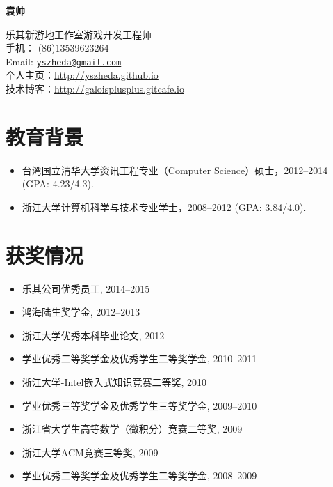 \documentclass[letterpaper]{article}
\def\name{袁帅}
\begin{document}
\centerline{\huge\bf \name} \vspace{0.25in}
\begin{minipage}[t]{0.8\textwidth}
    乐其新游地工作室游戏开发工程师 \\
    手机： (86)13539623264   \\
    Email: \href{mailto:yszheda@gmail.com}{\tt yszheda@gmail.com}\\
    个人主页：\url{http://yszheda.github.io} \\
    技术博客：\url{http://galoisplusplus.gitcafe.io}
\end{minipage}

\section*{教育背景}
\begin{itemize}
    \item 台湾国立清华大学资讯工程专业（Computer Science）硕士，2012--2014 (GPA: 4.23/4.3).
    \item 浙江大学计算机科学与技术专业学士，2008--2012 (GPA: 3.84/4.0).
\end{itemize}

\section*{获奖情况}
\begin{itemize}
    \item 乐其公司优秀员工, 2014--2015
    \item 鸿海陆生奖学金, 2012--2013				
    \item 浙江大学优秀本科毕业论文, 2012
    \item 学业优秀二等奖学金及优秀学生二等奖学金, 2010--2011
    \item 浙江大学-Intel嵌入式知识竞赛二等奖, 2010
    \item 学业优秀三等奖学金及优秀学生三等奖学金, 2009--2010
    \item 浙江省大学生高等数学（微积分）竞赛二等奖, 2009
    \item 浙江大学ACM竞赛三等奖, 2009
    \item 学业优秀二等奖学金及优秀学生二等奖学金, 2008--2009
\end{itemize}
\end{document}

